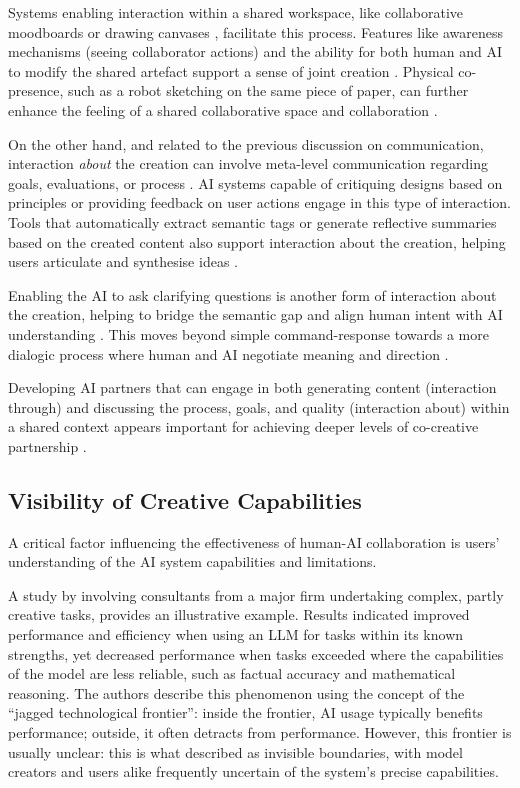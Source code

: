 Systems enabling interaction within a shared workspace, like collaborative moodboards \citep{Koch2020-gx} or drawing canvases \citep{Davis2016-te, Lawton2023-tb}, facilitate this process. Features like awareness mechanisms (seeing collaborator actions) \citep{Koch2020-gx} and the ability for both human and AI to modify the shared artefact support a sense of joint creation \citep{Lawton2023-tb}. Physical co-presence, such as a robot sketching on the same piece of paper, can further enhance the feeling of a shared collaborative space and collaboration \citep{Lin2020-ji}.

On the other hand, and related to the previous discussion on communication, interaction \textit{about} the creation can involve meta-level communication regarding goals, evaluations, or process \citep{Rezwana2022-gg, Bown2020-oc}. AI systems capable of critiquing designs based on principles \citep{Zhou2024-vp} or providing feedback on user actions \citep{Davis2016-te} engage in this type of interaction. Tools that automatically extract semantic tags or generate reflective summaries based on the created content also support interaction about the creation, helping users articulate and synthesise ideas \citep{Koch2020-gx}.

Enabling the AI to ask clarifying questions is another form of interaction about the creation, helping to bridge the semantic gap and align human intent with AI understanding \citep{Bown2020-oc, Coenen2021-ym}. This moves beyond simple command-response towards a more dialogic process where human and AI negotiate meaning and direction \citep{Bown2020-oc, Lin2023-jd}.

Developing AI partners that can engage in both generating content (interaction through) and discussing the process, goals, and quality (interaction about) within a shared context appears important for achieving deeper levels of co-creative partnership \citep{Davis2016-te, Bown2020-oc, Zhou2024-vp}.

\subsection{Visibility of Creative Capabilities}

A critical factor influencing the effectiveness of human-AI collaboration is users' understanding of the AI system capabilities and limitations.

A study by \citet{DellAcqua2023-og} involving consultants from a major firm undertaking complex, partly creative tasks, provides an illustrative example. Results indicated improved performance and efficiency when using an LLM for tasks within its known strengths, yet decreased performance when tasks exceeded where the capabilities of the model are less reliable, such as factual accuracy and mathematical reasoning. The authors describe this phenomenon using the concept of the ``jagged technological frontier'': inside the frontier, AI usage typically benefits performance; outside, it often detracts from performance. However, this frontier is usually unclear: this is what \citet{Buschek2021-ks} described as invisible boundaries, with model creators and users alike frequently uncertain of the system's precise capabilities.


